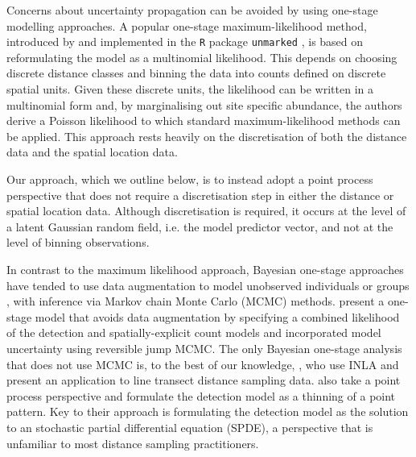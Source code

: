 \documentclass{statsoc}
\begin{document}
Concerns about uncertainty propagation can be avoided by using one-stage modelling approaches.  A popular one-stage maximum-likelihood method, introduced by \cite{royle_ModelingAbundanceEffects_2004} and implemented in the \texttt{R} package \texttt{unmarked} \citep{fiske_UnmarkedPackageFitting_2011}, is based on reformulating the model as a multinomial likelihood.  This depends on choosing discrete distance classes and binning the data into counts defined on discrete spatial units.  Given these discrete units, the likelihood can be written in a multinomial form and, by marginalising out site specific abundance, the authors derive a Poisson likelihood to which standard maximum-likelihood methods can be applied. This approach rests heavily on the discretisation of both the distance data and the spatial location data.

Our approach, which we outline below, is to instead adopt a point process perspective that does not require a discretisation step in either the distance or spatial location data. Although discretisation is required, it occurs at the level of a latent Gaussian random field, i.e. the model predictor vector, and not at the level of binning observations.

In contrast to the maximum likelihood approach, Bayesian one-stage approaches have tended to use data augmentation to model unobserved individuals or groups \citep{schmidt_using_2012}, with inference via Markov chain Monte Carlo (MCMC) methods.  \citet{oedekoven_bayesian_2014} present a one-stage model that avoids data augmentation by specifying a combined likelihood of the detection and spatially-explicit count models and incorporated model uncertainty using reversible jump MCMC. The only Bayesian one-stage analysis that does not use MCMC is, to the best of our knowledge, \citet{yuan_point_2017}, who use INLA and present an application to line transect distance sampling data.  \citet{yuan_point_2017} also take a point process perspective and formulate the detection model as a thinning of a point pattern.  Key to their approach is formulating the detection model as the solution to an stochastic partial differential equation (SPDE), a perspective that is unfamiliar to most distance sampling practitioners.
\end{document}
